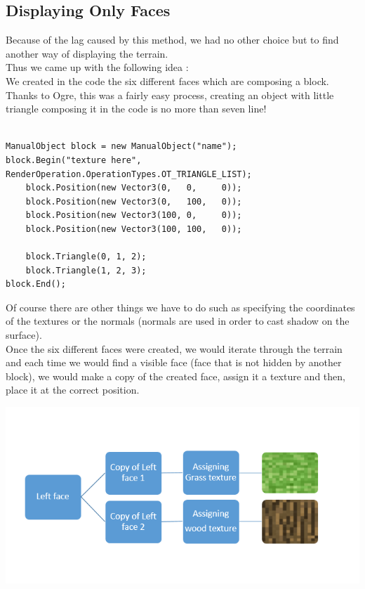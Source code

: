 \documentclass[article]{report}         %
\begin{document}
        \subsection{Displaying Only Faces}
          Because of the lag caused by this method, we had no other choice but to find another way of displaying the terrain.\\
          Thus we came up with the following idea :\\
          We created in the code the six different faces which are composing a block.\\
          Thanks to Ogre, this was a fairly easy process, creating an object with little triangle composing it in the code is no more than seven line!
          \begin{lstlisting}

ManualObject block = new ManualObject("name");
block.Begin("texture here", RenderOperation.OperationTypes.OT_TRIANGLE_LIST);
    block.Position(new Vector3(0,   0,     0));
    block.Position(new Vector3(0,   100,   0));
    block.Position(new Vector3(100, 0,     0));
    block.Position(new Vector3(100, 100,   0));

    block.Triangle(0, 1, 2);
    block.Triangle(1, 2, 3);
block.End();
        \end{lstlisting}

        Of course there are other things we have to do such as specifying the coordinates of the textures or the normals (normals are used in order to cast shadow on the surface).\\
 
        Once the six different faces were created, we would iterate through the terrain and each time we would find a visible face (face that is not hidden by another block), we would make a copy of the created face, assign it a texture and then, place it at the correct position.

        \begin{center}
            \includegraphics[width=16cm]{images/Display.png}
        \end{center}
\end{document}
